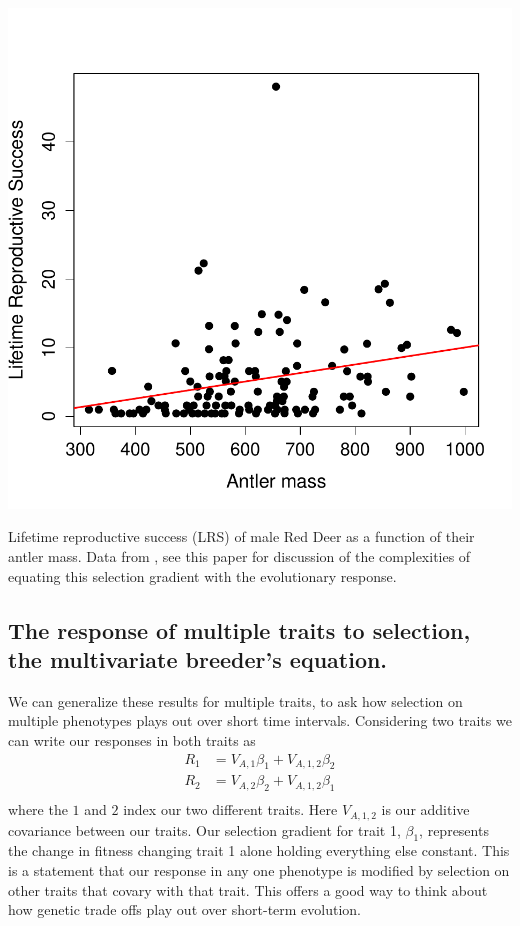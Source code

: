\begin{marginfigure}
\begin{center}
\includegraphics[width= \textwidth]{Journal_figs/Quant_gen/red_deer_selection_gradient/selection_grad_deer.pdf}
\end{center}
\caption{Lifetime reproductive success (LRS) of male Red Deer as a function of their antler mass. Data from \citet{kruuk2002antler}, see this paper for discussion of the complexities of equating this selection gradient with the evolutionary response. } \label{fig:red_deer_fitness_grad}  
\end{marginfigure}

\subsection{The response of multiple traits to selection, the
  multivariate breeder's equation.}
We can generalize these results for multiple traits, to ask how selection on
multiple phenotypes plays out over short time intervals. \cite{lande:79} Considering two traits we can write our responses in both traits as
\begin{eqnarray}
R_1 & = V_{A,1} \beta_1 + V_{A,1,2} \beta_2 \nonumber \\
R_2 & = V_{A,2} \beta_2 + V_{A,1,2} \beta_1  \nonumber \\
\end{eqnarray}
where the $1$ and $2$ index our two different traits. Here $V_{A,1,2}$ is our additive covariance between our traits. Our selection gradient for trait 1, $\beta_1$, represents the change in fitness changing trait 1 alone holding everything else constant. This is a statement that our response in any one phenotype is modified by selection on other traits that covary with that trait. This offers a good way to think about how genetic trade offs play out over short-term evolution.

